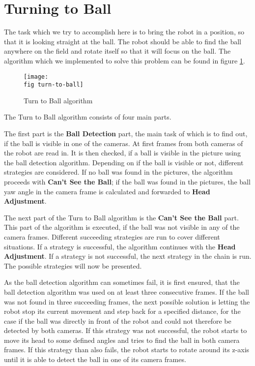 \section{Turning to Ball}
\label{j sec turning to ball}

The task which we try to accomplish here is to bring the robot in a position,
so that it is looking straight at the ball. The robot should be able to find
the ball anywhere on the field and rotate itself so that it will focus on the
ball. The algorithm which we implemented to solve this problem can be found
in figure \ref{j figure turn to ball}.

\begin{figure}[ht]
  \texttt{[image: \\fig turn-to-ball]}
  \caption{Turn to Ball algorithm}
  \label{j figure turn to ball}
\end{figure}

The Turn to Ball algorithm consists of four main parts.

The first part is the \textbf{Ball Detection} part, the main task of which is
to find out, if the ball is visible in one of the cameras. At first frames from
both cameras of the robot are read in. It is then checked, if a ball is visible
in the picture using the ball detection algorithm. Depending on if the ball is
visible or not, different strategies are considered. If no ball was found in
the pictures, the algorithm proceeds with \textbf{Can't See the Ball}; if the
ball was found in the pictures, the ball yaw angle in the camera frame is
calculated and forwarded to \textbf{Head Adjustment}.

The next part of the Turn to Ball algorithm is the \textbf{Can't See the Ball}
part. This part of the algorithm is executed, if the ball was not visible in
any of the camera frames. Different succeeding strategies are run to cover
different situations. If a strategy is successful, the algorithm continues with
the \textbf{Head Adjustment}. If a strategy is not successful, the next
strategy in the chain is run. The possible strategies will now be presented.

As the ball detection algorithm can sometimes fail, it is first ensured, that
the ball detection algorithm was used on at least three consecutive frames. If
the ball was not found in three succeeding frames, the next possible solution
is letting the robot stop its current movement and step back for a specified
distance, for the case if the ball was directly in front of the robot and could
not therefore be detected by both cameras. If this strategy was not successful,
the robot starts to move its head to some defined angles and tries to find the
ball in both camera frames. If this strategy than also fails, the robot starts
to rotate around its z-axis until it is able to detect the ball in one of its
camera frames.

